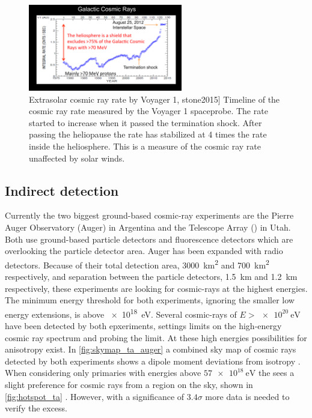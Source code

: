 \begin{figure}
    \centering
    \includegraphics[width=0.6\textwidth]
                    {plots/cosmic-rays/voyager_heliosphere}
    \caption{Extrasolar cosmic ray rate by Voyager 1, stone2015]
Timeline of the cosmic ray rate measured by the Voyager 1 spaceprobe. The rate started to increase when it passed the termination shock. After passing the heliopause the rate has stabilized at 4 times the rate inside the heliosphere. This is a measure of the cosmic ray rate unaffected by solar winds.}
    \label{fig:voyager_heliosphere}
\end{figure}


\subsection{Indirect detection}


Currently the two biggest ground-based cosmic-ray experiments are the Pierre Auger Observatory (Auger) \cite{abraham2004auger} in Argentina and the Telescope Array (\ta) \cite{abu-zayyad2012ta} in Utah. Both use ground-based particle detectors and fluorescence detectors which are overlooking the particle detector area. Auger has been expanded with radio detectors. Because of their total detection area, \SI{3000}{\kilo\meter\squared} and \SI{700}{\kilo\meter\squared} respectively, and separation between the particle detectors, \SI{1.5}{\kilo\meter} and \SI{1.2}{\kilo\meter} respectively, these experiments are looking for cosmic-rays at the highest energies. The minimum energy threshold for both experiments, ignoring the smaller low energy extensions, is above \SI{e18}{\eV}. Several cosmic-rays of $E > \SI{e20}{\eV}$ have been detected by both epxeriments, settings limits on the high-energy cosmic ray spectrum and probing the \gzk limit. At these high energies possibilities for anisotropy exist. In \cref{fig:skymap_ta_auger} a combined sky map of cosmic rays detected by both experiments shows a dipole moment deviations from isotropy \cite{abbasi2015combined}. When considering only primaries with energies above $\SI{57e18}{\eV}$ the \ta sees a slight preference for cosmic rays from a region on the sky, shown in \cref{fig:hotspot_ta} \cite{ta2014hotspot}. However, with a significance of $3.4 \sigma$ more data is needed to verify the excess.

